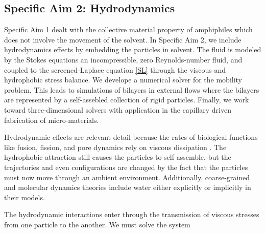 \subsection{Specific Aim 2: Hydrodynamics}
\label{subsec:specific_aim_2}
Specific Aim 1 dealt with the collective material property of amphiphiles which does not involve the movement of the solvent.
In Specific Aim 2, we include hydrodynamics effects by embedding the particles in solvent. 
The fluid is modeled by the Stokes equations an incompressible, zero Reynolds-number fluid, and coupled to the screened-Laplace equation \eqref{SL}
through the viscous and hydrophobic stress balance. We develope a numerical solver for the mobility problem. 
This leads to simulations of bilayers in external flows where the bilayers are represented by a self-assebled collection of rigid particles. 
Finally, we work toward three-dimensional solvers with application in the capillary driven fabrication of micro-materials. 

Hydrodynamic effects are relevant detail 
because the rates of biological functions like fusion, fission, and pore dynamics rely on viscous dissipation \cite{RYHAM20112929}. 
The hydrophobic attraction still causes the particles to self-assemble, but the trajectories and even configurations are changed
by the fact that the particles must now move through an ambient environment. 
Additionally, coarse-grained and molecular dynamics theories include water either explicitly or implicitly in their models. 
 
The hydrodynamic interactions enter through the transmission of viscous stresses from one particle to the another.  
We must solve the system 
\setcounter{midequation}{\theequation}
\addtocounter{midequation}{2}

